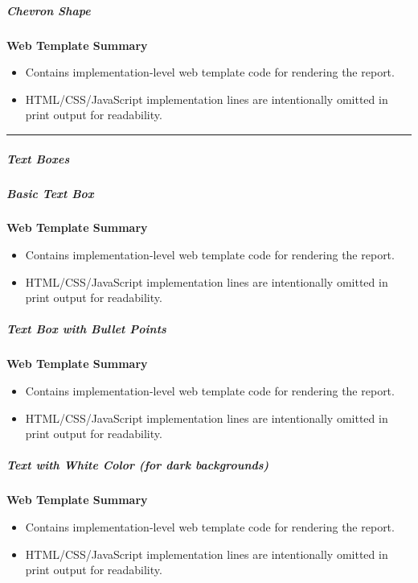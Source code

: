\documentclass[11pt]{article}
\begin{document}
\subparagraph{Chevron Shape}\mbox{}\par

\textbf{Web Template Summary}
\begin{itemize}[leftmargin=*,itemsep=2pt,topsep=2pt]
\item {} Contains implementation-level web template code for rendering the report.
\item {} HTML/CSS/JavaScript implementation lines are intentionally omitted in print output for readability.
\end{itemize}

\vspace{0.5em}\hrule\vspace{0.5em}

\subparagraph{Text Boxes}\mbox{}\par

\subparagraph{Basic Text Box}\mbox{}\par

\textbf{Web Template Summary}
\begin{itemize}[leftmargin=*,itemsep=2pt,topsep=2pt]
\item {} Contains implementation-level web template code for rendering the report.
\item {} HTML/CSS/JavaScript implementation lines are intentionally omitted in print output for readability.
\end{itemize}

\subparagraph{Text Box with Bullet Points}\mbox{}\par

\textbf{Web Template Summary}
\begin{itemize}[leftmargin=*,itemsep=2pt,topsep=2pt]
\item {} Contains implementation-level web template code for rendering the report.
\item {} HTML/CSS/JavaScript implementation lines are intentionally omitted in print output for readability.
\end{itemize}

\subparagraph{Text with White Color (for dark backgrounds)}\mbox{}\par

\textbf{Web Template Summary}
\begin{itemize}[leftmargin=*,itemsep=2pt,topsep=2pt]
\item {} Contains implementation-level web template code for rendering the report.
\item {} HTML/CSS/JavaScript implementation lines are intentionally omitted in print output for readability.
\end{itemize}
\end{document}
